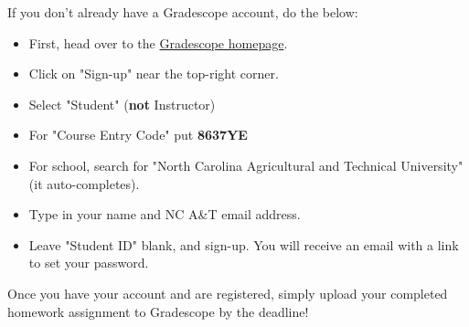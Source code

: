 \documentclass [12pt]{article}
\begin{document}
If you don't already have a Gradescope account, do the below:
\begin{itemize}
    \item First, head over to the \href{https://gradescope.com}{Gradescope homepage}. 
    \item Click on "Sign-up" near the top-right corner.
    \item Select "Student" (\textbf{not} Instructor)
    \item For "Course Entry Code" put \textbf{8637YE}
    \item For school, search for "North Carolina Agricultural and Technical University" (it auto-completes).
    \item Type in your name and NC A\&T email address.
    \item Leave "Student ID" blank, and sign-up. You will receive an email with a link to set your password.
\end{itemize}

Once you have your account and are registered, simply upload your completed homework assignment to Gradescope by the deadline!
\end{document}
